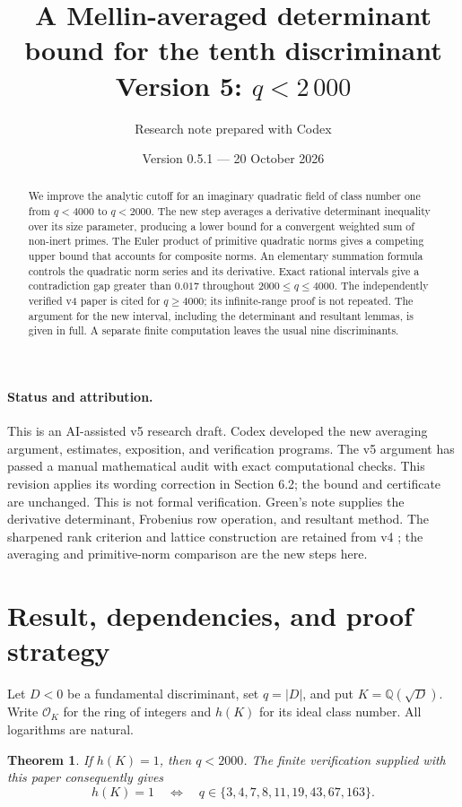 \documentclass[11pt]{article}
\title{A Mellin-averaged determinant bound for the tenth discriminant\\
\large Version 5: \(q<2\,000\)}
\author{Research note prepared with Codex}
\date{Version 0.5.1 --- 20 October 2026}
\newtheorem{theorem}{Theorem}
\newcommand{\Q}{\mathbb Q}
\newcommand{\OK}{\mathcal O_K}
\begin{document}
\maketitle

\begin{abstract}
We improve the analytic cutoff for an imaginary quadratic field of class
number one from \(q<4000\) to \(q<2000\). The new step averages a derivative
determinant inequality over its size parameter, producing a lower bound
for a convergent weighted sum of non-inert primes. The Euler product of
primitive quadratic norms gives a competing upper bound that accounts
for composite norms. An elementary summation formula controls the
quadratic norm series and its derivative. Exact rational intervals give
a contradiction gap greater than \(0.017\) throughout
\(2000\le q\le4000\). The independently verified v4 paper is cited for
\(q\ge4000\); its infinite-range proof is not repeated. The argument for
the new interval, including the determinant and resultant lemmas, is
given in full. A separate finite computation leaves the usual nine
discriminants.
\end{abstract}

\paragraph{Status and attribution.}
This is an AI-assisted v5 research draft. Codex developed the new
averaging argument, estimates, exposition, and verification programs.
The v5 argument has passed a manual mathematical audit with exact
computational checks. This revision applies its wording correction in
Section 6.2; the bound and certificate are unchanged. This is not formal
verification. Green's note \cite{green} supplies the
derivative determinant, Frobenius row operation, and resultant method.
The sharpened rank criterion and lattice construction are retained from
v4 \cite{v4}; the averaging and primitive-norm comparison are the new
steps here.

\section{Result, dependencies, and proof strategy}

Let \(D<0\) be a fundamental discriminant, set \(q=|D|\), and put
\(K=\Q(\sqrt D)\). Write \(\OK\) for the ring of integers and \(h(K)\)
for its ideal class number. All logarithms are natural.

\begin{theorem}\label{main}
If \(h(K)=1\), then \(q<2000\). The finite verification supplied with
this paper consequently gives
\[
 h(K)=1\quad\Longleftrightarrow\quad
 q\in\{3,4,7,8,11,19,43,67,163\}.
\]
\end{theorem}
\end{document}
